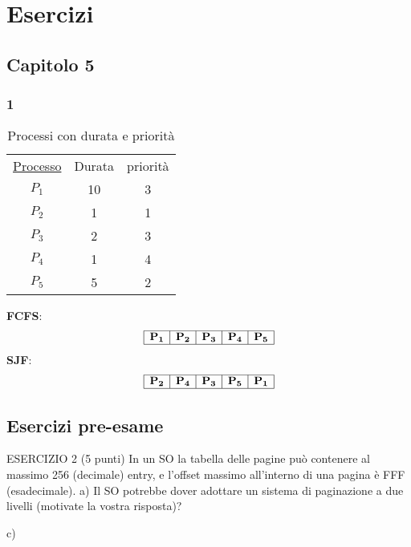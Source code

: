 \setcounter{chapter}{98}
\chapter{Esercizi}
\section{Capitolo 5}
\subsection{1}
\begin{table}[h]
    \centering
    \begin{tabular}{c c c}
        \underline{Processo} & Durata & priorità \\
        $P_1$ & 10 & 3 \\
        $P_2$ & 1 & 1 \\
        $P_3$ & 2 & 3 \\
        $P_4$ & 1 & 4 \\
        $P_5$ & 5 & 2 \\
    \end{tabular}
    \caption{Processi con durata e priorità}
    \label{tab:processi}
\end{table}
\textbf{FCFS}:
\[
\begin{array}{|c|c|c|c|c|}
  \hline
  \mathbf{P_1} & \mathbf{P_2} & \mathbf{P_3} & \mathbf{P_4} & \mathbf{P_5} \\
  \hline
\end{array}
\]
\textbf{SJF}:
\[\begin{array}{|c|c|c|c|c|}
  \hline
  \mathbf{P_2} & \mathbf{P_4} & \mathbf{P_3} & \mathbf{P_5} & \mathbf{P_1} \\
  \hline
\end{array}\]

\section{Esercizi pre-esame}
ESERCIZIO 2 (5 punti)
In un SO la tabella delle pagine può contenere al massimo 256 (decimale) entry, e
l’offset massimo all’interno di una pagina è FFF (esadecimale).
a) Il SO potrebbe dover adottare un sistema di paginazione a due livelli (motivate la
vostra risposta)?

c) 
